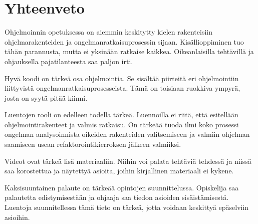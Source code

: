 \section{Yhteenveto}

Ohjelmoinnin opetuksessa on aiemmin keskitytty kielen rakenteisiin
ohjelmarakenteiden ja ongelmanratkaisuprosessin sijaan. Kisällioppiminen tuo
tähän parannusta, mutta ei yksinään ratkaise kaikkea. Oikeanlaisilla tehtävillä
ja ohjauksella pajatilanteesta saa paljon irti.

Hyvä koodi on tärkeä osa ohjelmointia. Se sisältää piirteitä eri ohjelmointiin
liittyvistä ongelmanratkaisuprosesseista. Tämä on toisiaan ruokkiva ympyrä,
josta on syytä pitää kiinni.

Luentojen rooli on edelleen todella tärkeä. Luennoilla ei riitä, että esitellään
ohjelmointirakenteet ja valmis ratkaisu. On tärkeää tuoda ilmi koko prosessi
ongelman analysoinnista oikeiden rakenteiden valitsemiseen ja valmiin ohjelman
saamiseen usean refaktorointikierroksen jälkeen valmiiksi.

Videot ovat tärkeä lisä materiaaliin. Niihin voi palata tehtäviä tehdessä ja
niissä saa korostettua ja näytettyä asioita, joihin kirjallinen materiaali ei
kykene.

Kaksisuuntainen palaute on tärkeää opintojen suunnittelussa. Opiskelija saa
palautetta edistymisestään ja ohjaaja saa tiedon asioiden sisäistämisestä.
Luentoja suunnitellessa tämä tieto on tärkeä, jotta voidaan keskittyä epäselviin
asioihin.
